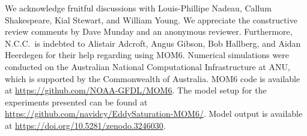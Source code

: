 \documentclass{agujournal2019}
\newcommand{\navidcomment}[1]{{\color{red} [#1]}}
\begin{document}







\acknowledgments
We acknowledge fruitful discussions with Louis-Phillipe Nadeau, Callum Shakespeare, Kial Stewart, and William Young. {\color{black}We appreciate the constructive review comments by Dave Munday and an anonymous reviewer.} Furthermore, N.C.C.~is indebted to Alistair Adcroft, Angus Gibson, Bob Hallberg, and Aidan Heerdegen for their help regarding using MOM6. Numerical simulations were conducted on the Australian National Computational Infrastructure at ANU, which is supported by the Commonwealth of Australia. MOM6 code is available at \url{https://github.com/NOAA-GFDL/MOM6}. The model setup for the experiments presented can be found at \url{https://github.com/navidcy/EddySaturation-MOM6/}. Model output is available at \url{https://doi.org/10.5281/zenodo.3246030}.
\end{document}

